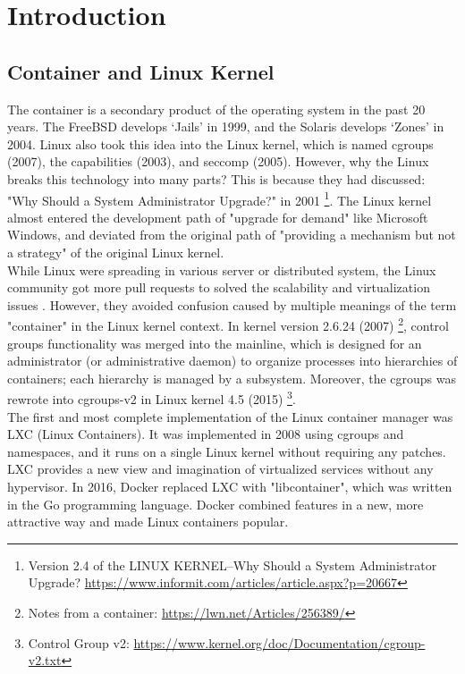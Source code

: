 \chapter{Introduction}

\section{Container and Linux Kernel}

The container is a secondary product of the operating system in the past 20 years.
The FreeBSD develops `Jails' in 1999, and the Solaris develops `Zones' in 2004.
Linux also took this idea into the Linux kernel, which is named cgroups (2007),
the capabilities (2003), and seccomp (2005). However, why the Linux breaks this
technology into many parts? This is because they had discussed:
"Why Should a System Administrator Upgrade?" in 2001
\footnote{Version 2.4 of the LINUX KERNEL--Why Should a System Administrator Upgrade?
    \url{https://www.informit.com/articles/article.aspx?p=20667}}.
The Linux kernel almost entered the development path of "upgrade for demand" like
Microsoft Windows, and deviated from the original path of "providing a mechanism
but not a strategy" of the original Linux kernel. \\

While Linux were spreading in various server or distributed system, the
Linux community got more pull requests to solved the scalability and virtualization
issues \cite{267148}. However, they avoided confusion caused by multiple meanings of
the term "container" in the Linux kernel context. In kernel version 2.6.24 (2007)
\footnote{Notes from a container: \url{https://lwn.net/Articles/256389/}},
control groups functionality was merged into the mainline,
which is designed for an administrator (or administrative daemon) to organize processes
into hierarchies of containers; each hierarchy is managed by a subsystem. Moreover, the
cgroups was rewrote into cgroups-v2 in Linux kernel 4.5 (2015)
\footnote{Control Group v2: \url{https://www.kernel.org/doc/Documentation/cgroup-v2.txt}}.\\

The first and most complete implementation of the Linux container manager was LXC
(Linux Containers). It was implemented in 2008 using cgroups and namespaces,
and it runs on a single Linux kernel without requiring any patches. LXC provides
a new view and imagination of virtualized services without any hypervisor. In 2016,
Docker replaced LXC with "libcontainer", which was written in the Go programming language.
Docker combined features in a new, more attractive way and made Linux containers popular.\\

